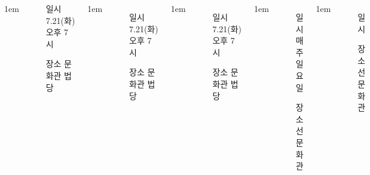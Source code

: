 \documentclass[	20pt, 
							a1paper, 
							portrait, %
							margin=0mm, %
							innermargin=10mm,  		%
							colspace=5mm, 
							subcolspace=0mm
							]{tikzposter}
\begin{document}
\begin{columns}
			{
					\setlength{\leftmargini}{4em}
					\setlength{\labelsep} {1em}
				\begin{LARGE}
					\begin{itemize}
					\item [일시] 7.21(화) 오후 7시
					\item [장소] 문화관 법당
					\end{itemize}
				\end{LARGE}
			}


			{
					\setlength{\leftmargini}{4em}
					\setlength{\labelsep} {1em}
					\begin{itemize}
					\item [일시] 7.21(화) 오후 7시
					\item [장소] 문화관 법당
					\end{itemize}
			}

			{
					\setlength{\leftmargini}{4em}
					\setlength{\labelsep} {1em}
					\begin{itemize}
					\item [일시] 7.21(화) 오후 7시
					\item [장소] 문화관 법당
					\end{itemize}
			}






			{
					\setlength{\leftmargini}{4em}
					\setlength{\labelsep} {1em}
					\begin{itemize}
					\item [일시] 매주 일요일
					\item [장소] 선문화관
					\end{itemize}
			}



			{
					\setlength{\leftmargini}{4em}
					\setlength{\labelsep} {1em}
					\begin{itemize}
					\item [일시] 
					\item [장소] 선문화관
					\end{itemize}
			}



\end{columns}
\end{document}
